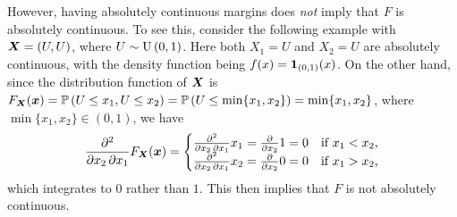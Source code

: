 \begin{enumerate}
However, having absolutely continuous margins does \emph{not} imply that \(F\) is
absolutely continuous. To see this, consider the following example with
\(\bm{X}=(U,U)\), where \(U\sim \operatorname{U}\left(0,1\right)\). Here both \(X_1=U\) and
\(X_2=U\) are absolutely continuous, with the density function being
\(f(x)=\mathbf{1}_{(0,1)}(x)\). On the other hand, since the distribution function
of \(\bm{X}\) is \(F_{\bm{X}}(\bm{x})=\mathbb{P}\left(U\le x_1, U\le
x_2\right)=\mathbb{P}\left(U\le\min\{x_1,x_2\}\right)=\min\{x_1,x_2\}\), where \(\min\{x_1,x_2\}\in
(0,1)\), we have
\[
\pdv{}{x_2,x_1}F_{\bm{X}}(\bm{x})=
\begin{cases}
\pdv{}{x_2,x_1}x_1=\pdv{}{x_2}1=0&\text{if \(x_1<x_2\),} \\
\pdv{}{x_2,x_1}x_2=\pdv{}{x_2}0=0&\text{if \(x_1>x_2\),} \\
\end{cases}
\]
which integrates to \(0\) rather than \(1\). This then implies that \(F\) is
not absolutely continuous.
\end{enumerate}
